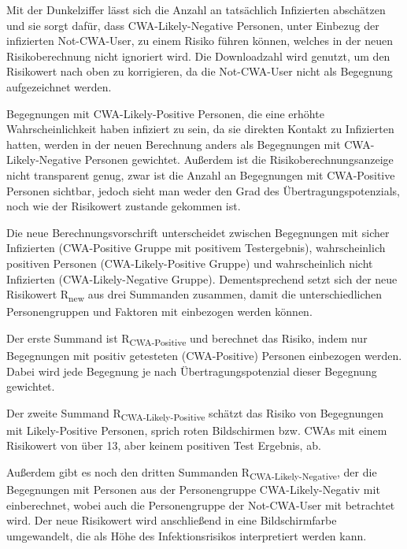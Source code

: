 \documentclass[conference,compsoc]{IEEEtran}
\begin{document}
Mit der Dunkelziffer lässt sich die Anzahl an tatsächlich Infizierten abschätzen und sie sorgt dafür, dass CWA-Likely-Negative Personen, 
unter Einbezug der infizierten Not-CWA-User, zu einem Risiko führen können, welches in der neuen Risikoberechnung nicht ignoriert wird.
Die Downloadzahl wird genutzt, um den Risikowert nach oben zu korrigieren, da die Not-CWA-User nicht als Begegnung aufgezeichnet werden.

Begegnungen mit CWA-Likely-Positive Personen, die eine erhöhte Wahrscheinlichkeit haben infiziert zu sein, da sie direkten Kontakt zu Infizierten hatten, 
werden in der neuen Berechnung anders als Begegnungen mit CWA-Likely-Negative Personen gewichtet.
Außerdem ist die Risikoberechnungsanzeige nicht transparent genug, zwar ist die Anzahl an Begegnungen mit CWA-Positive Personen sichtbar, 
jedoch sieht man weder den Grad des Übertragungspotenzials, noch wie der Risikowert zustande gekommen ist.

Die neue Berechnungsvorschrift unterscheidet zwischen Begegnungen mit sicher Infizierten (CWA-Positive Gruppe mit positivem Testergebnis),
wahrscheinlich positiven Personen (CWA-Likely-Positive Gruppe) und wahrscheinlich nicht Infizierten (CWA-Likely-Negative Gruppe). 
Dementsprechend setzt sich der neue Risikowert R\textsubscript{new} aus drei Summanden zusammen,
damit die unterschiedlichen Personengruppen und Faktoren mit einbezogen werden können.

\centerline{\text{ }}
\centerline{}
\centerline{}
\centerline{\text{ }}

Der erste Summand ist R\textsubscript{CWA-Positive} und berechnet das Risiko, indem nur Begegnungen mit positiv getesteten (CWA-Positive) Personen einbezogen werden. 
Dabei wird jede Begegnung je nach Übertragungspotenzial dieser Begegnung gewichtet. 

Der zweite Summand R\textsubscript{CWA-Likely-Positive} schätzt das Risiko von Begegnungen mit Likely-Positive Personen, sprich roten Bildschirmen bzw. 
CWAs mit einem Risikowert von über 13, aber keinem positiven Test Ergebnis, ab.

Außerdem gibt es noch den dritten Summanden R\textsubscript{CWA-Likely-Negative}, der die Begegnungen mit Personen aus der Personengruppe CWA-Likely-Negativ mit einberechnet,
wobei auch die Personengruppe der Not-CWA-User mit betrachtet wird.
Der neue Risikowert wird anschließend in eine Bildschirmfarbe umgewandelt, die als Höhe des Infektionsrisikos interpretiert werden kann.
\end{document}
